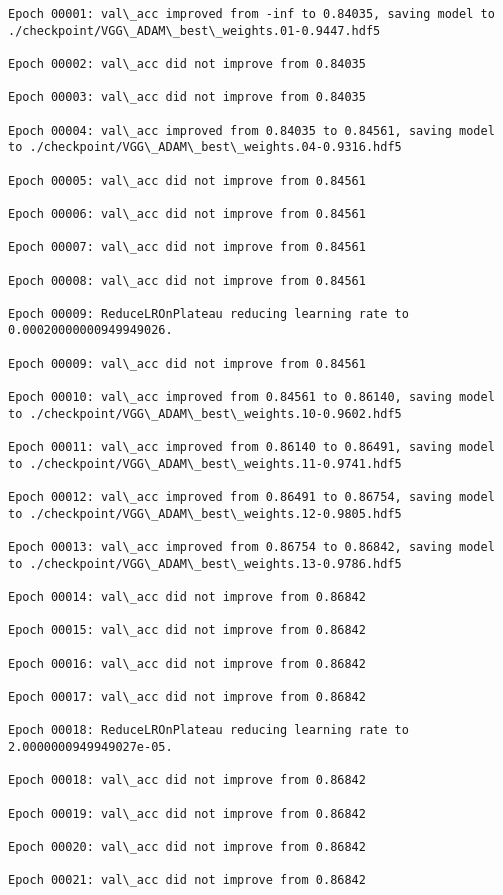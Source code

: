 \documentclass[11pt]{article}
\begin{document}
\begin{Verbatim}[commandchars=\\\{\}]
Epoch 00001: val\_acc improved from -inf to 0.84035, saving model to ./checkpoint/VGG\_ADAM\_best\_weights.01-0.9447.hdf5

Epoch 00002: val\_acc did not improve from 0.84035

Epoch 00003: val\_acc did not improve from 0.84035

Epoch 00004: val\_acc improved from 0.84035 to 0.84561, saving model to ./checkpoint/VGG\_ADAM\_best\_weights.04-0.9316.hdf5

Epoch 00005: val\_acc did not improve from 0.84561

Epoch 00006: val\_acc did not improve from 0.84561

Epoch 00007: val\_acc did not improve from 0.84561

Epoch 00008: val\_acc did not improve from 0.84561

Epoch 00009: ReduceLROnPlateau reducing learning rate to 0.00020000000949949026.

Epoch 00009: val\_acc did not improve from 0.84561

Epoch 00010: val\_acc improved from 0.84561 to 0.86140, saving model to ./checkpoint/VGG\_ADAM\_best\_weights.10-0.9602.hdf5

Epoch 00011: val\_acc improved from 0.86140 to 0.86491, saving model to ./checkpoint/VGG\_ADAM\_best\_weights.11-0.9741.hdf5

Epoch 00012: val\_acc improved from 0.86491 to 0.86754, saving model to ./checkpoint/VGG\_ADAM\_best\_weights.12-0.9805.hdf5

Epoch 00013: val\_acc improved from 0.86754 to 0.86842, saving model to ./checkpoint/VGG\_ADAM\_best\_weights.13-0.9786.hdf5

Epoch 00014: val\_acc did not improve from 0.86842

Epoch 00015: val\_acc did not improve from 0.86842

Epoch 00016: val\_acc did not improve from 0.86842

Epoch 00017: val\_acc did not improve from 0.86842

Epoch 00018: ReduceLROnPlateau reducing learning rate to 2.0000000949949027e-05.

Epoch 00018: val\_acc did not improve from 0.86842

Epoch 00019: val\_acc did not improve from 0.86842

Epoch 00020: val\_acc did not improve from 0.86842

Epoch 00021: val\_acc did not improve from 0.86842


\end{Verbatim}
\end{document}
